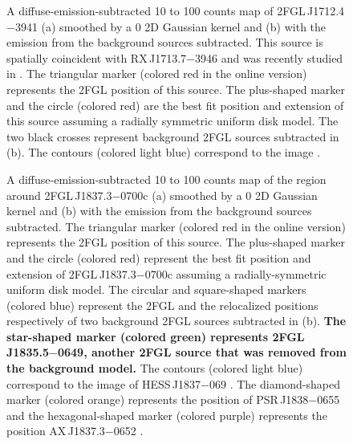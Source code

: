 \documentclass[12pt,preprint]{aastex}
\newif\ifcolorfigure
\newcommand{\gev}{\text{GeV}\xspace}
\newcommand{\tev}{\text{TeV}\xspace}
\newcommand{\newtext}[1]{{\bfseries \color{red}#1}}
\begin{document}
\begin{figure}
    \ifcolorfigure
      \plotone{source_plots/source_RX_J1713.7-3946_color.eps}
    \else
    \fi
  \caption{
  A diffuse-emission-subtracted 10 \gev to 100 \gev counts map
  of 2FGL\,J1712.4$-$3941 (a) smoothed by a 0 2D
  Gaussian kernel and (b) with the emission from the background sources
  subtracted.  This source is spatially coincident with RX\,J1713.7$-$3946
  and was recently studied in \cite{rx_j1713_lat}.  The triangular marker
  (colored red in the online version) represents the 2FGL position of
  this source.  The plus-shaped marker and the circle (colored red) are
  the best fit position and extension of this source assuming a radially
  symmetric uniform disk model.  
  The two black crosses represent background 2FGL sources subtracted in (b).
  The contours (colored light blue)
  correspond to the \tev image \citep{rx_j1713_hess}.  
  }\label{2FGL_J1712.4-3941}
\end{figure}


\begin{figure}
    \ifcolorfigure
      \plotone{source_plots/source_HESS_J1837-069_color.eps}
    \else
    \fi
  \caption{
  A diffuse-emission-subtracted 10 \gev to 100 \gev counts map of the
  region around 2FGL\,J1837.3$-$0700c (a) smoothed by a 0 2D Gaussian
  kernel and (b) with the emission from the background sources subtracted.
  The triangular marker (colored red in the online version) represents
  the 2FGL
  position of this source. 
  The plus-shaped marker and 
  the circle (colored red) represent the best fit position and extension
  of 2FGL\,J1837.3$-$0700c assuming a radially-symmetric uniform disk model. 
  The circular and square-shaped markers (colored
  blue) represent the 2FGL and the relocalized positions respectively of
  two background 2FGL sources subtracted in (b).  \newtext{The star-shaped marker
  (colored green) represents 2FGL\,J1835.5$-$0649, another 2FGL source that was removed from the
  background model.}  The contours (colored light blue) correspond to
  the \tev image of HESS\,J1837$-$069
  \citep{hess_plane_survey}.
  The diamond-shaped marker (colored orange) represents the position of PSR\,J1838$-$0655
  and the hexagonal-shaped marker (colored purple) represents the position AX\,J1837.3$-$0652
  \citep{pulsations_HESS_J1837-069}.
  }\label{1FGL_J1837.5-0659c}
\end{figure}
\end{document}
